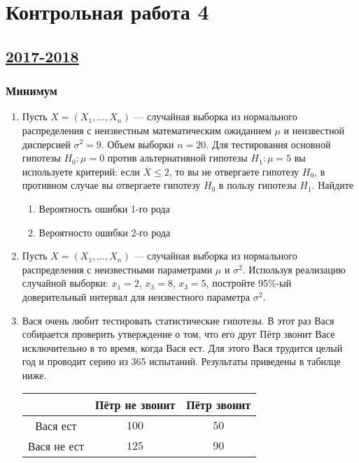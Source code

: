 \section{Контрольная работа 4}



\subsection[2017-2018]{\hyperref[sec:sol_kr_04_2017_2018]{2017-2018}}
\label{sec:kr_04_2017_2018}



\subsubsection*{Минимум}

\begin{enumerate}


	\item Пусть $X=(X_{1}, \ldots,X_{n})$ — случайная выборка из нормального распределения с неизвестным математическим ожиданием $\mu$ и неизвестной дисперсией $\sigma^2=9$. Объем выборки $n=20$. Для тестирования основной гипотезы $H_{0}:\mu=0$ против альтернативной гипотезы $H_{1}:\mu=5$ вы используете критерий: если $\overline{X}\leq2$, то вы не отвергаете гипотезу $H_{0}$, в противном случае вы отвергаете гипотезу $H_{0}$ в пользу гипотезы $H_{1}$. Найдите
	\begin{enumerate}
	\item Вероятность ошибки 1-го рода
	\item Вероятносто ошибки 2-го рода
	\end{enumerate}


		\item Пусть $X=(X_{1}, \ldots,X_{n})$ — случайная выборка из нормального распределения с неизвестными параметрами $\mu$ и $\sigma^2$. Используя реализацию случайной выборки: $x_{1}=2$, $x_{3}=8$, $x_{3}=5$, постройте 95\%-ый доверительный интервал для неизвестного параметра $\sigma^2$.


	\item Вася очень любит тестировать статистические гипотезы. В этот раз Вася собирается проверить утверждение о том, что его друг Пётр звонит Васе исключительно в то время, когда Вася ест. Для этого Вася трудится целый год и проводит серию из 365 испытаний. Результаты приведены в табилце ниже.

	\begin{center}
		\begin{tabular}{c|cc}
			\toprule
			& Пётр не звонит & Пётр звонит\\
			\midrule
			Вася ест & $100$ & $50$\\
			Вася не ест  & $125$ & $90$\\
			\bottomrule
		\end{tabular}
	\end{center}


\end{enumerate}
